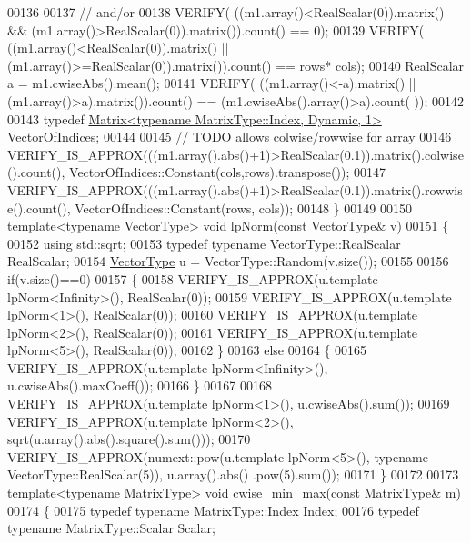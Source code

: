 \begin{DoxyCode}
00136 
00137   \textcolor{comment}{// and/or}
00138   VERIFY( ((m1.array()<RealScalar(0)).matrix() && (m1.array()>RealScalar(0)).matrix()).count() == 0);
00139   VERIFY( ((m1.array()<RealScalar(0)).matrix() || (m1.array()>=RealScalar(0)).matrix()).count() == rows*
      cols);
00140   RealScalar a = m1.cwiseAbs().mean();
00141   VERIFY( ((m1.array()<-a).matrix() || (m1.array()>a).matrix()).count() == (m1.cwiseAbs().array()>a).count(
      ));
00142 
00143   \textcolor{keyword}{typedef} \hyperlink{group___core___module_class_eigen_1_1_matrix}{Matrix<typename MatrixType::Index, Dynamic, 1>} 
      VectorOfIndices;
00144 
00145   \textcolor{comment}{// TODO allows colwise/rowwise for array}
00146   VERIFY\_IS\_APPROX(((m1.array().abs()+1)>RealScalar(0.1)).matrix().colwise().count(), 
      VectorOfIndices::Constant(cols,rows).transpose());
00147   VERIFY\_IS\_APPROX(((m1.array().abs()+1)>RealScalar(0.1)).matrix().rowwise().count(), 
      VectorOfIndices::Constant(rows, cols));
00148 \}
00149 
00150 \textcolor{keyword}{template}<\textcolor{keyword}{typename} VectorType> \textcolor{keywordtype}{void} lpNorm(\textcolor{keyword}{const} \hyperlink{struct_vector_type}{VectorType}& v)
00151 \{
00152   \textcolor{keyword}{using} std::sqrt;
00153   \textcolor{keyword}{typedef} \textcolor{keyword}{typename} VectorType::RealScalar RealScalar;
00154   \hyperlink{struct_vector_type}{VectorType} u = VectorType::Random(v.size());
00155 
00156   \textcolor{keywordflow}{if}(v.size()==0)
00157   \{
00158     VERIFY\_IS\_APPROX(u.template lpNorm<Infinity>(), RealScalar(0));
00159     VERIFY\_IS\_APPROX(u.template lpNorm<1>(), RealScalar(0));
00160     VERIFY\_IS\_APPROX(u.template lpNorm<2>(), RealScalar(0));
00161     VERIFY\_IS\_APPROX(u.template lpNorm<5>(), RealScalar(0));
00162   \}
00163   \textcolor{keywordflow}{else}
00164   \{
00165     VERIFY\_IS\_APPROX(u.template lpNorm<Infinity>(), u.cwiseAbs().maxCoeff());
00166   \}
00167 
00168   VERIFY\_IS\_APPROX(u.template lpNorm<1>(), u.cwiseAbs().sum());
00169   VERIFY\_IS\_APPROX(u.template lpNorm<2>(), sqrt(u.array().abs().square().sum()));
00170   VERIFY\_IS\_APPROX(numext::pow(u.template lpNorm<5>(), \textcolor{keyword}{typename} VectorType::RealScalar(5)), u.array().abs()
      .pow(5).sum());
00171 \}
00172 
00173 \textcolor{keyword}{template}<\textcolor{keyword}{typename} MatrixType> \textcolor{keywordtype}{void} cwise\_min\_max(\textcolor{keyword}{const} MatrixType& m)
00174 \{
00175   \textcolor{keyword}{typedef} \textcolor{keyword}{typename} MatrixType::Index Index;
00176   \textcolor{keyword}{typedef} \textcolor{keyword}{typename} MatrixType::Scalar Scalar;

\end{DoxyCode}

